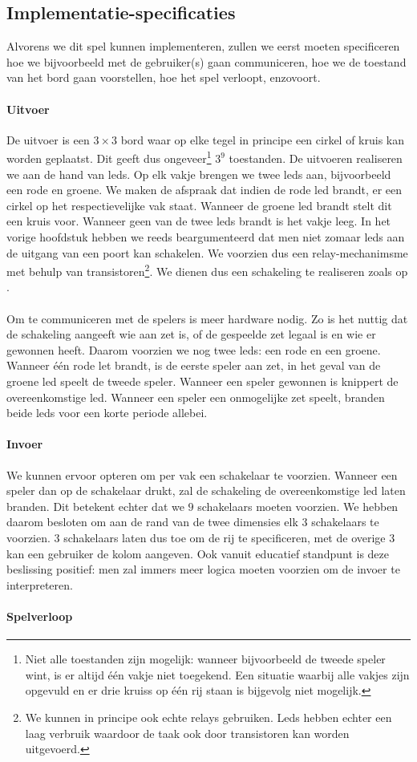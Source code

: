 \subsection{Implementatie-specificaties}
Alvorens we dit spel kunnen implementeren, zullen we eerst moeten specificeren hoe we bijvoorbeeld met de gebruiker(s) gaan communiceren, hoe we de toestand van het bord gaan voorstellen, hoe het spel verloopt, enzovoort.
\paragraph{Uitvoer}
De uitvoer is een $3\times 3$ bord waar op elke tegel in principe een cirkel of kruis kan worden geplaatst. Dit geeft dus ongeveer\footnote{Niet alle toestanden zijn mogelijk: wanneer bijvoorbeeld de tweede speler wint, is er altijd \'e\'en vakje niet toegekend. Een situatie waarbij alle vakjes zijn opgevuld en er drie kruiss op \'e\'en rij staan is bijgevolg niet mogelijk.} $3^9$ toestanden. De uitvoeren realiseren we aan de hand van leds. Op elk vakje brengen we twee leds aan, bijvoorbeeld een rode en groene. We maken de afspraak dat indien de rode led brandt, er een cirkel op het respectievelijke vak staat. Wanneer de groene led brandt stelt dit een kruis voor. Wanneer geen van de twee leds brandt is het vakje leeg. In het vorige hoofdstuk hebben we reeds beargumenteerd dat men niet zomaar leds aan de uitgang van een poort kan schakelen. We voorzien dus een relay-mechanimsme met behulp van transistoren\footnote{We kunnen in principe ook echte relays gebruiken. Leds hebben echter een laag verbruik waardoor de taak ook door transistoren kan worden uitgevoerd.}. We dienen dus een schakeling te realiseren zoals op .
\paragraph{}
Om te communiceren met de spelers is meer hardware nodig. Zo is het nuttig dat de schakeling aangeeft wie aan zet is, of de gespeelde zet legaal is en wie er gewonnen heeft. Daarom voorzien we nog twee leds: een rode en een groene. Wanneer \'e\'en rode let brandt, is de eerste speler aan zet, in het geval van de groene led speelt de tweede speler. Wanneer een speler gewonnen is knippert de overeenkomstige led. Wanneer een speler een onmogelijke zet speelt, branden beide leds voor een korte periode allebei.
\paragraph{Invoer}
We kunnen ervoor opteren om per vak een schakelaar te voorzien. Wanneer een speler dan op de schakelaar drukt, zal de schakeling de overeenkomstige led laten branden. Dit betekent echter dat we $9$ schakelaars moeten voorzien. We hebben daarom besloten om aan de rand van de twee dimensies elk $3$ schakelaars te voorzien. $3$ schakelaars laten dus toe om de rij te specificeren, met de overige $3$ kan een gebruiker de kolom aangeven. Ook vanuit educatief standpunt is deze beslissing positief: men zal immers meer logica moeten voorzien om de invoer te interpreteren.
\paragraph{Spelverloop}
